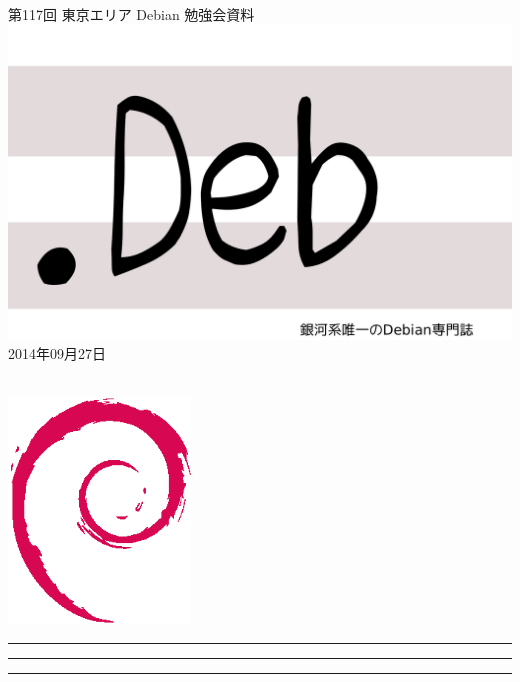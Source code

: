 \documentclass[mingoth,a4paper]{jsarticle}
\newcommand{\debmtgyear}{2014}
\newcommand{\debmtgmonth}{09}
\newcommand{\debmtgdate}{27}
\newcommand{\debmtgnumber}{117}
\begin{document}
\begin{titlepage}
\thispagestyle{empty}

\vspace*{-2cm}
第\debmtgnumber{}回 東京エリア Debian 勉強会資料\\
\hspace*{-2cm}
\includegraphics{image2012-natsu/dotdeb.pdf}\\
\hfill{}\debmtgyear{}年\debmtgmonth{}月\debmtgdate{}日

\\

\vspace*{-2cm}
\hfill{}\includegraphics[height=6cm]{image200502/openlogo-nd.eps}
\end{titlepage}

\newpage

\begin{minipage}[b]{0.2\hsize}
 \colorbox{titleback}{}
\end{minipage}
\begin{minipage}[b]{0.8\hsize}
\hrule
\vspace{2mm}
\hrule
\begin{multicols}{2}
\tableofcontents
\end{multicols}
\vspace{2mm}
\hrule
\end{minipage}
\end{document}
